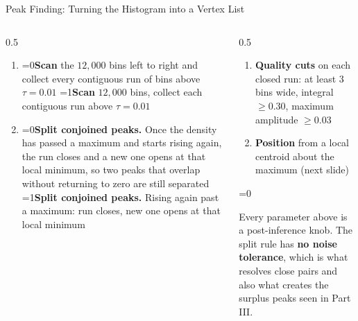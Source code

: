 \documentclass[xcolor=table,aspectratio=169]{beamer}
\newcommand{\pvcap}[1]{{\scriptsize\textcolor{black!55}{#1}}}
\providecommand{\talkbuild}{0}
\newcommand{\readingonly}[1]{\ifnum\talkbuild=0\relax#1\fi}
\newcommand{\talkonly}[1]{\ifnum\talkbuild=1\relax#1\fi}
\begin{document}
\begin{frame}{Peak Finding: Turning the Histogram into a Vertex List}
    \vspace{0.35em}
    \begin{columns}[t]
        \begin{column}{0.5\linewidth}
            \footnotesize
            \begin{enumerate}\setlength\itemsep{0.3em}
                \item \readingonly{\textbf{Scan} the $12{,}000$ bins left to right and collect every
                    contiguous run of bins above $\tau = 0.01$}%
                    \talkonly{\textbf{Scan} $12{,}000$ bins, collect each contiguous
                    run above $\tau = 0.01$}
                \item \readingonly{\textbf{Split conjoined peaks.} Once the density has passed a
                    maximum and starts rising again, the run closes and a new one opens
                    at that local minimum, so two peaks that overlap
                    without returning to zero are still separated}%
                    \talkonly{\textbf{Split conjoined peaks.} Rising again past a
                    maximum: run closes, new one opens at that local minimum}
            \end{enumerate}
        \end{column}
        \begin{column}{0.5\linewidth}
            \footnotesize
            \begin{enumerate}\setlength\itemsep{0.35em}\setcounter{enumi}{2}
                \item \textbf{Quality cuts} on each closed run: at least $3$ bins wide,
                    integral $\geq 0.30$, maximum amplitude $\geq 0.03$
                \item \textbf{Position} from a local centroid about the maximum (next slide)
            \end{enumerate}
            \readingonly{\vspace{0.4em}

            \pvcap{Every parameter above is a post-inference knob. The split rule has
            \textbf{no noise tolerance}, which is what resolves close pairs and also
            what creates the surplus peaks seen in Part III.}}
        \end{column}
    \end{columns}
\end{frame}
\end{document}
